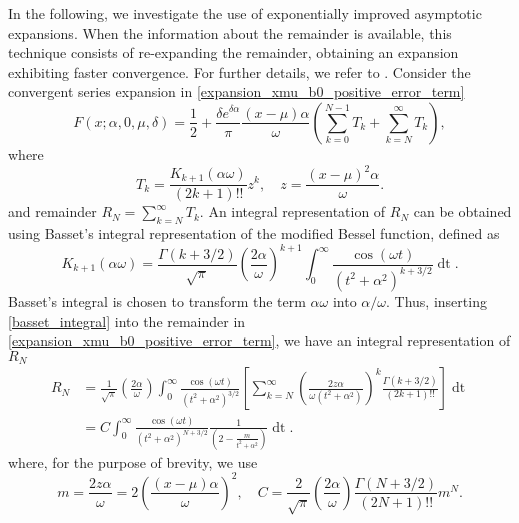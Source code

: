 \documentclass[10pt,a4paper,oneside]{article}
\numberwithin{equation}{section}
\begin{document}
In the following, we investigate the use of exponentially improved asymptotic expansions. When the information about the remainder is available, this technique consists of re-expanding the remainder, obtaining an expansion exhibiting faster convergence. For further details, we refer to \cite[\S 14]{Olver1997}. Consider the convergent series expansion in \eqref{expansion_xmu_b0_positive_error_term}
\begin{equation}
F(x;\alpha, 0, \mu, \delta) = \frac{1}{2} + \frac{\delta e^{\delta \alpha}}{\pi} \frac{(x-\mu)\alpha}{\omega} \left(\sum_{k=0}^{N-1} T_k + \sum_{k=N}^{\infty} T_k\right),
\end{equation}
where
\begin{equation}
T_k = \frac{K_{k+1}(\alpha\omega)}{(2k + 1)!!} z^k, \quad z = \frac{(x-\mu)^2 \alpha}{\omega}.
\end{equation}
and remainder $R_N = \sum_{k=N}^{\infty} T_k$. An integral representation of $R_N$ can be obtained using Basset's integral \cite[\S 10.32.11]{NIST:DLMF} representation of the modified Bessel function, defined as
\begin{equation}\label{basset_integral}
K_{k+1}(\alpha\omega) = \frac{\Gamma(k + 3/2)}{\sqrt{\pi}}\left(\frac{2\alpha}{\omega}\right)^{k+1} \int_0^{\infty} \frac{\cos(\omega t)}{(t^2 + \alpha^2)^{k + 3/2}} \mathop{dt}.
\end{equation}
Basset's integral is chosen to transform the term $\alpha\omega$ into $\alpha/\omega$. Thus, inserting \eqref{basset_integral} into the remainder in \eqref{expansion_xmu_b0_positive_error_term}, we have an integral representation of $R_N$
\begin{align}\label{convergent_remainder_integral}
R_N &= \frac{1}{\sqrt{\pi}} \left(\frac{2\alpha}{\omega}\right) \int_0^{\infty} \frac{\cos(\omega t)}{(t^2 + \alpha^2)^{3/2}} \left[\sum_{k=N}^{\infty} \left(\frac{2z\alpha}{\omega (t^2 + \alpha^2)}\right)^k \frac{\Gamma(k + 3/2)}{(2k + 1)!!}\right] \mathop{dt}\nonumber\\
&= C \int_0^{\infty} \frac{\cos(\omega t)}{(t^2 + \alpha^2)^{N + 3/2}} \frac{1}{\left(2 - \frac{m}{t^2+ \alpha^2}\right)} \mathop{dt}.
\end{align}
where, for the purpose of brevity, we use
\begin{equation}
m = \frac{2z\alpha}{\omega} = 2\left(\frac{(x-\mu)\alpha}{\omega}\right)^2,  \quad C = \frac{2}{\sqrt{\pi}} \left(\frac{2\alpha}{\omega}\right)\frac{\Gamma(N + 3/2)}{(2N + 1)!!} m^N.
\end{equation}
\end{document}
